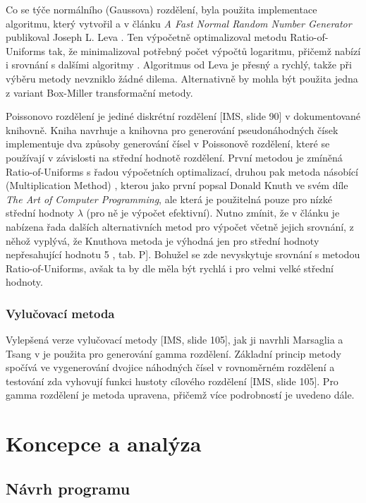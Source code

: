\documentclass[a4paper,11pt]{article}
\begin{document}
Co se týče normálního (Gaussova) rozdělení, byla použita implementace algoritmu, který vytvořil a v článku \emph{A Fast Normal Random Number Generator} publikoval Joseph L. Leva \cite{Leva}. Ten výpočetně optimalizoval metodu Ratio-of-Uniforms tak, že minimalizoval potřebný počet výpočtů logaritmu, přičemž nabízí i srovnání s dalšími algoritmy \cite{Leva}. Algoritmus od Leva je přesný a rychlý, takže při výběru metody nevzniklo žádné dilema. Alternativně by mohla být použita jedna z variant Box-Miller transformační metody.

Poissonovo rozdělení je jediné diskrétní rozdělení [IMS, slide 90] v dokumentované knihovně. Kniha \cite{NR} navrhuje a knihovna pro generování pseudonáhodných čísek implementuje dva způsoby generování čísel v Poissonově rozdělení, které se používají v závislosti na střední hodnotě rozdělení. První metodou je zmíněná Ratio-of-Uniforms s řadou výpočetních optimalizací, druhou pak metoda násobící (Multiplication Method) \cite{AD}, kterou jako první popsal Donald Knuth ve svém díle \emph{The Art of Computer Programming}, ale která je použitelná pouze pro nízké střední hodnoty $\lambda$ (pro ně je výpočet efektivní). Nutno zmínit, že v článku \cite{AD} je nabízena řada dalších alternativních metod pro výpočet včetně jejich srovnání, z něhož vyplývá, že Knuthova metoda je výhodná jen pro střední hodnoty nepřesahující hodnotu 5 \cite{AD}, tab. P]. Bohužel se zde nevyskytuje srovnání s metodou Ratio-of-Uniforms, avšak ta by dle \cite{NR} měla být rychlá i pro velmi velké střední hodnoty.

\subsubsection{Vylučovací metoda}
Vylepšená verze vylučovací metody [IMS, slide 105], jak ji navrhli Marsaglia a Tsang v \cite{Marsaglia} je použita pro generování gamma rozdělení. Základní princip metody spočívá ve vygenerování dvojice náhodných čísel v rovnoměrném rozdělení a testování zda vyhovují funkci hustoty cílového rozdělení [IMS, slide 105]. Pro gamma rozdělení je metoda upravena, přičemž více podrobností je uvedeno dále.

\section{Koncepce a analýza}

\subsection{Návrh programu}
\end{document}
